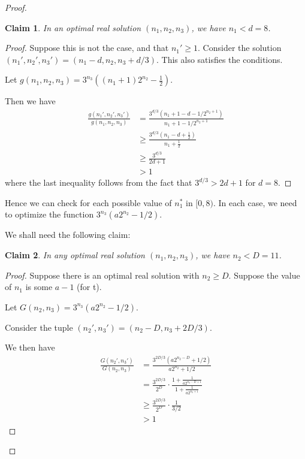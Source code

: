 \documentclass[answers]{exam}
\newtheorem{claim}{Claim}
\begin{document}
\begin{questions}
\begin{solution}
\begin{proof}
\begin{claim}
    In an optimal real solution $(n_1, n_2, n_3)$, we have $n_1 < d = 8$.
\end{claim}
\begin{proof}
    Suppose this is not the case, and that $n_1' \ge 1$. Consider the solution $(n_1', n_2', n_3') = (n_1 - d, n_2, n_3 + d/3)$. This also satisfies the conditions.
    
    Let $g(n_1, n_2, n_3) = 3^{n_3}((n_1 + 1) 2^{n_2} - \frac{1}{2})$.
    
    Then we have 
    \begin{align*}
    \frac{g(n_1', n_2', n_3')}{g(n_1, n_2, n_3)} 
    &= \frac{3^{d/3} (n_1 + 1 - d - 1/2^{n_2 + 1})}{n_1 + 1 - 1/2^{n_2 + 1}}\\
    &\ge \frac{3^{d/3}(n_1 - d + \frac{1}{2})}{n_1 + \frac{1}{2}}\\
    &\ge \frac{3^{d/3}}{2d + 1}\\
    &> 1
    \end{align*}
    where the last inequality follows from the fact that $3^{d/3} > 2d + 1$ for $d = 8$.
\end{proof}

Hence we can check for each possible value of $n_1^*$ in $[0, 8)$. In each case, we need to optimize the function $3^{n_3}(a 2^{n_2} - 1/2)$.

We shall need the following claim:

\begin{claim}
    In any optimal real solution $(n_1, n_2, n_3)$, we have $n_2 < D = 11$.
\end{claim}
\begin{proof}
    Suppose there is an optimal real solution with $n_2 \ge D$.
    Suppose the value of $n_1$ is some $a - 1$ (for t). 
    
    Let $G(n_2, n_3) = 3^{n_3}(a2^{n_2} - 1/2)$.
    
    Consider the tuple $(n_2', n_3') = (n_2 - D, n_3 + 2D/3)$.
    
    We then have 
    \begin{align*}
        \frac{G(n_2', n_3')}{G(n_2, n_3)} 
        &= \frac{3^{2D/3} (a2^{n_2 - D} + 1/2)}{a2^{n_2} + 1/2}\\
        &= \frac{3^{2D/3}}{2^D} \cdot \frac{1 + \frac{1}{a2^{n_2 - D + 1}}}{1 + \frac{1}{a2^{n_2 + 1}}}\\
        &\ge \frac{3^{2D/3}}{2^D} \cdot \frac{1}{3/2}\\
        &> 1
    \end{align*}
    

\end{proof}
\end{proof}
\end{solution}
\end{questions}
\end{document}
